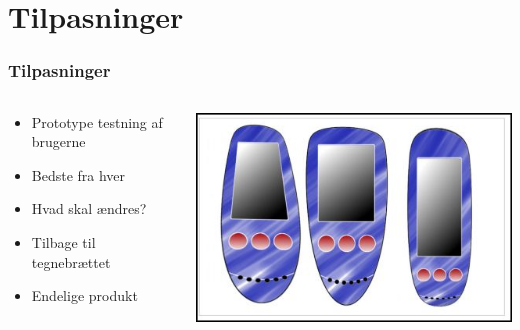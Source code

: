\documentclass{beamer}
\begin{document}
\section{Tilpasninger}
\begin{frame}
\frametitle{Tilpasninger}
  \begin{columns}[T]
    \begin{column}{.6\textwidth}
	  \begin{itemize}
		\item Prototype testning af brugerne
		\item Bedste fra hver
		\item Hvad skal ændres?
		\item Tilbage til tegnebrættet
		\item Endelige produkt
	  \end{itemize}
    \end{column}
    \begin{column}{.4\textwidth}
      \includegraphics[width=\textwidth]{alt.jpg}
    \end{column}
  \end{columns}
\end{frame}
\end{document}
